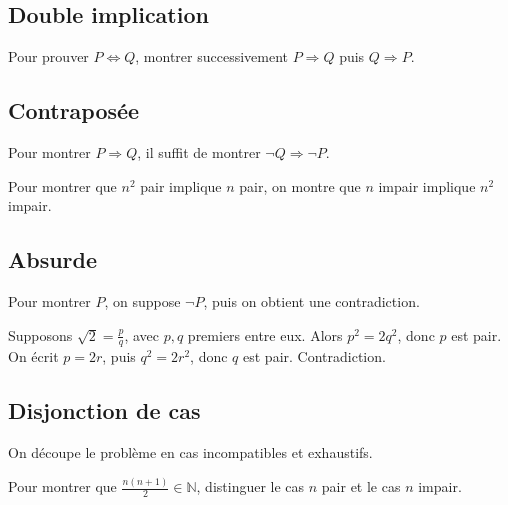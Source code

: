 \documentclass[11pt,a4paper]{article}
\newcommand{\N}{\mathbb{N}}
\newcommand{\non}{\neg}
\newcommand{\imp}{\Rightarrow}
\newcommand{\ssi}{\Longleftrightarrow}
\begin{document}
\subsection{Double implication}

\begin{methodebox}
Pour prouver \(P\ssi Q\), montrer successivement \(P\imp Q\) puis \(Q\imp P\).
\end{methodebox}

\subsection{Contraposée}

\begin{methodebox}
Pour montrer \(P\imp Q\), il suffit de montrer \(\non Q\imp\non P\).
\end{methodebox}

\begin{exemplebox}
Pour montrer que \(n^2\) pair implique \(n\) pair, on montre que \(n\) impair implique \(n^2\) impair.
\end{exemplebox}

\subsection{Absurde}

\begin{methodebox}
Pour montrer \(P\), on suppose \(\non P\), puis on obtient une contradiction.
\end{methodebox}

\begin{exemplebox}
Supposons \(\sqrt2=\frac pq\), avec \(p,q\) premiers entre eux. Alors \(p^2=2q^2\), donc \(p\) est pair. On écrit \(p=2r\), puis \(q^2=2r^2\), donc \(q\) est pair. Contradiction.
\end{exemplebox}

\subsection{Disjonction de cas}

\begin{methodebox}
On découpe le problème en cas incompatibles et exhaustifs.
\end{methodebox}

\begin{exemplebox}
Pour montrer que \(\frac{n(n+1)}2\in\N\), distinguer le cas \(n\) pair et le cas \(n\) impair.
\end{exemplebox}
\end{document}
